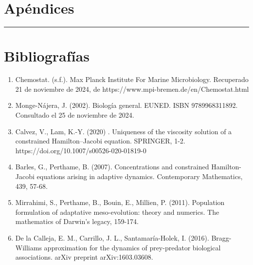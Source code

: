 \documentclass[letterpaper]{article}
\begin{document}
    \section{Apéndices}

    \vspace{0.2cm}
        \rule{150mm}{0.5mm} %
    \vspace{0.2cm}

    	
    \section{Bibliografías}

    \begin{enumerate}
        \item {

            \normalsize{Chemostat. (s.f.). Max Planck Institute For Marine Microbiology. Recuperado 21 de noviembre de 2024, de https://www.mpi-bremen.de/en/Chemostat.html}

        }

        \item {

            \normalsize{Monge-Nájera, J. (2002). Biología general. EUNED. ISBN 9789968311892. Consultado el 25 de noviembre de 2024.}
        
        }

        \item{
            \normalsize{Calvez, V., Lam, K.-Y. (2020) . Uniqueness of the viscosity solution of a constrained Hamilton–Jacobi equation. SPRINGER, 1-2. https://doi.org/10.1007/s00526-020-01819-0} 
        }

        \item {
            \normalsize{Barles, G., Perthame, B. (2007). Concentrations and constrained Hamilton-Jacobi equations arising in adaptive dynamics. Contemporary Mathematics, 439, 57-68.}
        }

        \item{
            \normalsize{Mirrahimi, S., Perthame, B., Bouin, E., Millien, P. (2011). Population formulation of adaptative meso-evolution: theory and numerics. The mathematics of Darwin’s legacy, 159-174.}
        }

        \item{
            \normalsize{De la Calleja, E. M., Carrillo, J. L., Santamaría-Holek, I. (2016). Bragg-Williams approximation for the dynamics of prey-predator biological associations. arXiv preprint arXiv:1603.03608.}
        }
    \end{enumerate}
\end{document}
